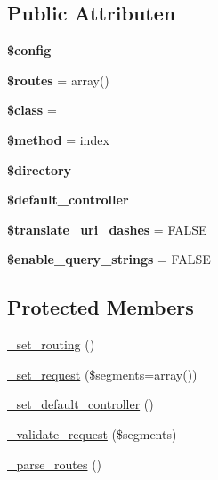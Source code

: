 \subsection*{Public Attributen}
\begin{DoxyCompactItemize}
\item 
\mbox{\label{class_c_i___router_a49c7011be9c979d9174c52a8b83e5d8e}} 
{\bfseries \$config}
\item 
\mbox{\label{class_c_i___router_a8f7eb04a54e0f0bfc0cedeb9899ce4a8}} 
{\bfseries \$routes} = array()
\item 
\mbox{\label{class_c_i___router_a252ba022809910ea710a068fc1bab657}} 
{\bfseries \$class} = \textquotesingle{}\textquotesingle{}
\item 
\mbox{\label{class_c_i___router_a12661b2fc0f57f97e30a1620889ce9c6}} 
{\bfseries \$method} = \textquotesingle{}index\textquotesingle{}
\item 
\mbox{\label{class_c_i___router_a1b07c630eb02f770a082a013373a16d6}} 
{\bfseries \$directory}
\item 
\mbox{\label{class_c_i___router_ab949cccd963058f0937d04bc26ee24a7}} 
{\bfseries \$default\+\_\+controller}
\item 
\mbox{\label{class_c_i___router_a9693c124c7019ed8ec57166661044ba2}} 
{\bfseries \$translate\+\_\+uri\+\_\+dashes} = F\+A\+L\+SE
\item 
\mbox{\label{class_c_i___router_a8495f59271097c83f7703d433d96ff6d}} 
{\bfseries \$enable\+\_\+query\+\_\+strings} = F\+A\+L\+SE
\end{DoxyCompactItemize}
\subsection*{Protected Members}
\begin{DoxyCompactItemize}
\item 
\mbox{\hyperlink{class_c_i___router_abc9f3e0d48cec66f93a7f103c9a65892}{\+\_\+set\+\_\+routing}} ()
\item 
\mbox{\hyperlink{class_c_i___router_a92b8b486926e4dea5fee4d71f80a472a}{\+\_\+set\+\_\+request}} (\$segments=array())
\item 
\mbox{\hyperlink{class_c_i___router_a86b13067b062022251d2c7ecb4fb9492}{\+\_\+set\+\_\+default\+\_\+controller}} ()
\item 
\mbox{\hyperlink{class_c_i___router_a488aa4aaa52c36c4e6c791e7bfd76358}{\+\_\+validate\+\_\+request}} (\$segments)
\item 
\mbox{\hyperlink{class_c_i___router_a55a42fae865d03334b49baa5a5a6bd0b}{\+\_\+parse\+\_\+routes}} ()
\end{DoxyCompactItemize}


